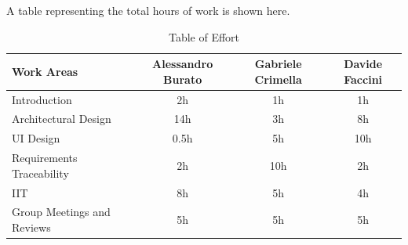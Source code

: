 A table representing the total hours of work is shown here.
\begin{table}[h]
\centering
\begin{tabular}{l c c c}
\toprule
Work Areas & Alessandro Burato & Gabriele Crimella & Davide Faccini \\
\midrule
Introduction & 2h & 1h & 1h\\
Architectural Design & 14h & 3h & 8h\\
UI Design & 0.5h & 5h & 10h\\
Requirements Traceability & 2h & 10h & 2h\\
IIT & 8h & 5h & 4h\\
Group Meetings and Reviews & 5h & 5h & 5h\\ 
\bottomrule
\end{tabular}
\caption{Table of Effort}
\end{table}